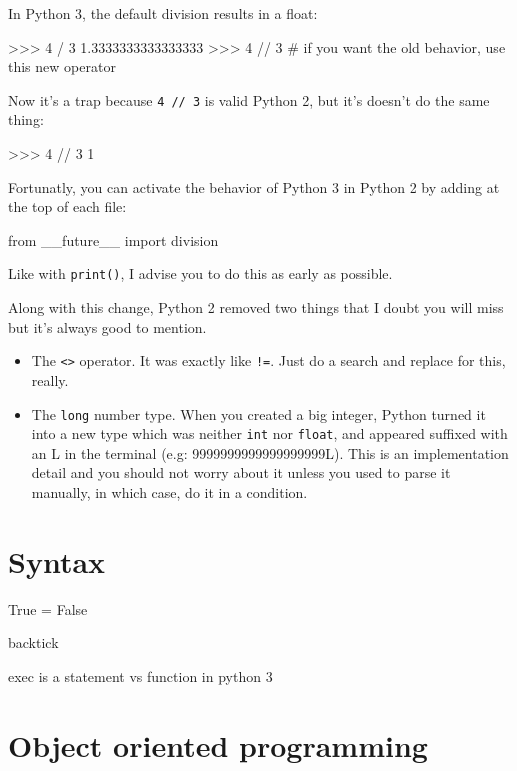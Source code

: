 In Python 3, the default division results in a float:

\begin{py3}
>>> 4 / 3
1.3333333333333333
>>> 4 // 3  # if you want the old behavior, use this new operator
\end{py3}

Now it's a trap because \lstinline{4 // 3} is valid Python 2, but it's doesn't do the same thing:

\begin{py2}
>>> 4 // 3
1
\end{py2}

Fortunatly, you can activate the behavior of Python 3 in Python 2 by adding at the top of each file:

\begin{py2and3}
from __future__ import division
\end{py2and3}

Like with \lstinline{print()}, I advise you to do this as early as possible.

Along with this change, Python 2 removed two things that I doubt you will miss but it's always good to mention.

\begin{itemize}
    \item The \lstinline{<>} operator. It was exactly like \lstinline{!=}. Just do a search and replace for this, really.
    \item The \lstinline{long} number type. When you created a big integer, Python turned it into a new type which was neither \lstinline{int} nor \lstinline{float}, and appeared suffixed with an L in the terminal (e.g: 9999999999999999999L). This is an implementation detail and you should not worry about it unless you used to parse it manually, in which case, do it in a condition.
\end{itemize}


\section{Syntax}

True = False

backtick

exec is a statement vs function in python 3


\section{Object oriented programming}


